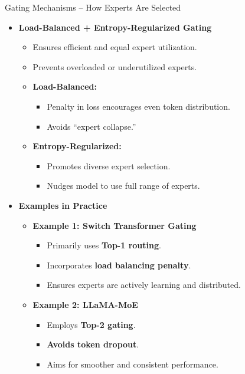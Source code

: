 \begin{frame}[allowframebreaks]{Gating Mechanisms – How Experts Are Selected}
\begin{itemize}
\begin{itemize}
            \end{itemize}
        \end{itemize}
    \framebreak
        \begin{itemize}
            \item \textbf{Load-Balanced + Entropy-Regularized Gating}
            \begin{itemize}
                \item Ensures efficient and equal expert utilization.
                \item Prevents overloaded or underutilized experts.
                \item \textbf{Load-Balanced:}
                \begin{itemize}
                    \item Penalty in loss encourages even token distribution.
                    \item Avoids ``expert collapse.''
                \end{itemize}
                \item \textbf{Entropy-Regularized:}
                \begin{itemize}
                    \item Promotes diverse expert selection.
                    \item Nudges model to use full range of experts.
                \end{itemize}
            \end{itemize}
        \framebreak
            \item \textbf{Examples in Practice}
            \begin{itemize}
                \item \textbf{Example 1: Switch Transformer Gating}
                \begin{itemize}
                    \item Primarily uses \textbf{Top-1 routing}.
                    \item Incorporates \textbf{load balancing penalty}.
                    \item Ensures experts are actively learning and distributed.
                \end{itemize}
                \item \textbf{Example 2: LLaMA-MoE}
                \begin{itemize}
                    \item Employs \textbf{Top-2 gating}.
                    \item \textbf{Avoids token dropout}.
                    \item Aims for smoother and consistent performance.
                \end{itemize}
            \end{itemize}
        \end{itemize}
\end{frame}